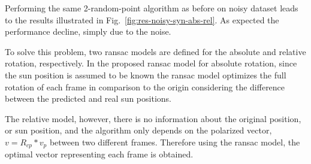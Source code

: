Performing the same 2-random-point algorithm as before on noisy dataset leads
to the results illustrated in Fig.~\ref{fig:res-noisy-syn-abs-rel}. As expected the
performance decline, simply due to the noise.

To solve this problem, two ransac models are defined for the absolute and
relative rotation, respectively.  In the proposed ransac model for absolute
rotation, since the sun position is assumed to be known the ransac model
optimizes the full rotation of each frame in comparison to the origin
considering the difference between the predicted and real sun positions.

The relative model, however, there is no information about the original
position, or sun position, and the algorithm only depends on the polarized
vector, $v = R_{cp}*v_p$ between two different frames. Therefore using the ransac
model, the optimal vector representing each frame is obtained.

